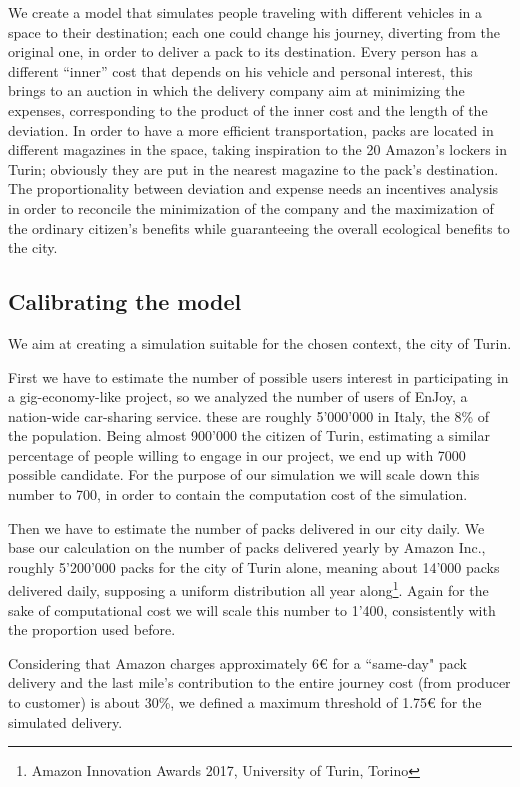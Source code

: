 \documentclass[11pt,a4paper]{article}
\begin{document}
We create a model that simulates people traveling with different vehicles in a space to their destination; each one could change his journey, diverting from the original one, in order to deliver a pack to its destination. 
Every person has a different “inner'' cost that depends on his vehicle and personal interest, this brings to an auction in which the delivery company aim at minimizing the expenses, corresponding to the product of the inner cost and the length of the deviation. 
In order to have a more efficient transportation, packs are located in different magazines in the space, taking inspiration to the 20 Amazon's lockers in Turin; obviously they are put in the nearest magazine to the pack's destination. 
The proportionality between deviation and expense needs an incentives analysis in order to reconcile the minimization of the company and the maximization of the ordinary citizen's benefits while guaranteeing the overall ecological benefits to the city.

\newpage
\subsection{Calibrating the model}
We aim at creating a simulation suitable for the chosen context, the city of Turin.

First we have to estimate the number of possible users interest in participating in a gig-economy-like project, so we analyzed the number of users of EnJoy, a nation-wide car-sharing service. these are roughly 5'000'000 in Italy, the 8\% of the population. Being almost 900'000 the citizen of Turin, estimating a similar percentage of people willing to engage in our project, we end up with 7000 possible candidate. For the purpose of our simulation we will scale down this number to 700, in order to contain the computation cost of the simulation.

Then we have to estimate the number of packs delivered in our city daily. We base our calculation on the number of packs delivered yearly by Amazon Inc., roughly 5'200'000 packs for the city of Turin alone, meaning about 14'000 packs delivered daily, supposing a uniform distribution all year along\footnote{Amazon Innovation Awards 2017, University of Turin, Torino}. Again for the sake of computational cost we will scale this number to 1'400, consistently with the proportion used before.

Considering that Amazon charges approximately 6\euro{} for a “same-day" pack delivery and the last mile's contribution to the entire journey cost (from producer to customer) is about 30\%, we defined a maximum threshold of 1.75\euro{} for the simulated delivery.
\end{document}
